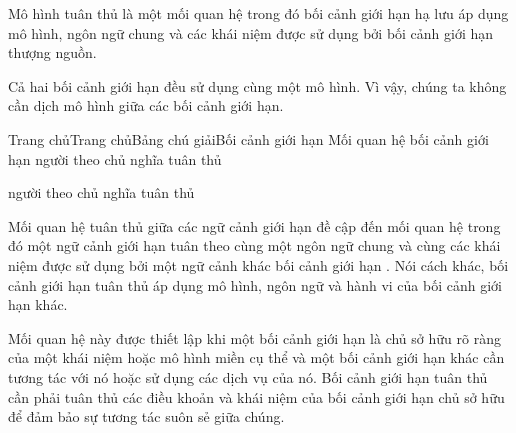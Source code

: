 Mô hình tuân thủ là một mối quan hệ trong đó bối cảnh giới hạn hạ lưu áp dụng mô hình, ngôn ngữ chung và các khái niệm được sử dụng bởi bối cảnh giới hạn thượng nguồn.

Cả hai bối cảnh giới hạn đều sử dụng cùng một mô hình. Vì vậy, chúng ta không cần dịch mô hình giữa các bối cảnh giới hạn.





















Trang chủTrang chủBảng chú giảiBối cảnh giới hạn Mối quan hệ bối cảnh giới hạn người theo chủ nghĩa tuân thủ

người theo chủ nghĩa tuân thủ

Mối quan hệ tuân thủ giữa các ngữ cảnh giới hạn đề cập đến mối quan hệ trong đó một ngữ cảnh giới hạn tuân theo cùng một ngôn ngữ chung và cùng các khái niệm được sử dụng bởi một ngữ cảnh khác bối cảnh giới hạn . Nói cách khác, bối cảnh giới hạn tuân thủ áp dụng mô hình, ngôn ngữ và hành vi của bối cảnh giới hạn khác.

Mối quan hệ này được thiết lập khi một bối cảnh giới hạn là chủ sở hữu rõ ràng của một khái niệm hoặc mô hình miền cụ thể và một bối cảnh giới hạn khác cần tương tác với nó hoặc sử dụng các dịch vụ của nó. Bối cảnh giới hạn tuân thủ cần phải tuân thủ các điều khoản và khái niệm của bối cảnh giới hạn chủ sở hữu để đảm bảo sự tương tác suôn sẻ giữa chúng.

